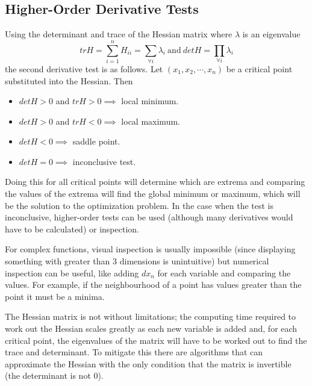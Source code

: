 \documentclass[10pt,a4paper]{report}
\begin{document}
			\subsection{Higher-Order Derivative Tests}
				Using the determinant and trace of the Hessian matrix where $\lambda$ is an eigenvalue
				\begin{equation}
					trH = \sum_{i=1}^n H_{ii} = \sum_{\forall i} \lambda_i \ \text{and} \ detH = \prod_{\forall i} \lambda_i
				\end{equation}
				the second derivative test is as follows.
				Let $(x_1,x_2,\cdots,x_n)$ be a critical point substituted into the Hessian. Then \autocite{SecondDerivativeTest}
				\begin{itemize}
					\item $detH > 0$ and $trH > 0 \implies$ local minimum.
					\item $detH > 0$ and $trH < 0 \implies$ local maximum.
					\item  $detH < 0 \implies$ saddle point.
					\item $detH = 0 \implies$ inconclusive test.
				\end{itemize}
				Doing this for all critical points will determine which are extrema and comparing the values of the extrema will find the global
				minimum or maximum, which will be the solution to the optimization problem. In the case when the test is inconclusive, higher-order
				tests \autocite{ExtremumTest} can be used (although many derivatives would have to be calculated) or inspection. \par
				For complex functions, visual inspection is usually impossible (since displaying something with greater than 3 dimensions is unintuitive) but numerical inspection can be useful, like
				adding $dx_n$ for each variable and comparing the values. For example, if the neighbourhood of a point has values greater than the point it must be a minima. \par
				The Hessian matrix is not without limitations; the computing time required to work out the Hessian scales greatly as each new variable is added and, for each critical
				point, the eigenvalues of the matrix will have to be worked out to find the trace and determinant. To mitigate this there are algorithms that can approximate the Hessian
				with the only condition that the matrix is invertible (the determinant is not 0).
\end{document}
